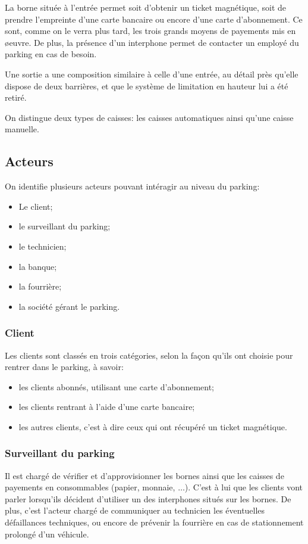 \documentclass[a4paper]{article}
\begin{document}
La borne situ\'ee \`a l'entr\'ee permet soit d'obtenir un ticket magn\'etique, soit de
prendre l'empreinte d'une carte bancaire ou encore d'une carte d'abonnement. Ce sont,
comme on le verra plus tard, les trois grands moyens de payements mis en \o euvre. De
plus, la pr\'esence d'un interphone permet de contacter un employ\'e du parking en
cas de besoin.

Une sortie a une composition similaire \`a celle d'une entr\'ee, au d\'etail pr\`es
qu'elle dispose de deux barri\`eres, et que le syst\`eme de limitation en hauteur
lui a \'et\'e retir\'e.

On distingue deux types de caisses: les caisses automatiques ainsi qu'une caisse
manuelle.

\subsection{Acteurs}
On identifie plusieurs acteurs pouvant int\'eragir au niveau du parking:
\begin{itemize}
	\item Le client;
	\item le surveillant du parking;
	\item le technicien;
	\item la banque;
	\item la fourri\`ere;
	\item la soci\'et\'e g\'erant le parking.
\end{itemize}

\subsubsection{Client}
Les clients sont class\'es en trois cat\'egories, selon la fa\c con qu'ils ont choisie
pour rentrer dans le parking, \`a savoir:
\begin{itemize}
	\item les clients abonn\'es, utilisant une carte d'abonnement;
	\item les clients rentrant \`a l'aide d'une carte bancaire;
	\item les autres clients, c'est \`a dire ceux qui ont r\'ecup\'er\'e un
		ticket magn\'etique.
\end{itemize}
\subsubsection{Surveillant du parking}
Il est charg\'e de v\'erifier et d'approvisionner les bornes ainsi que les caisses
de payements en consommables (papier, monnaie, $\hdots$). C'est \`a lui que les
clients vont parler lorsqu'ils d\'ecident d'utiliser un des interphones situ\'es sur
les bornes. De plus, c'est l'acteur charg\'e de communiquer au technicien les \'eventuelles
d\'efaillances techniques, ou encore de pr\'evenir la fourri\`ere en cas de stationnement
prolong\'e d'un v\'ehicule.
\end{document}
